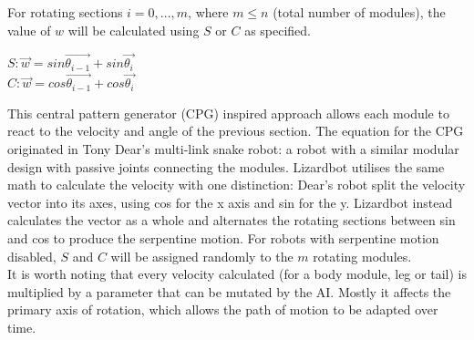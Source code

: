 \documentclass{article}
\begin{document}
For rotating sections $i = 0, ..., m$, where $m \leq n$ (total number of modules), the value of $w$ will be calculated using $S$ or $C$ as specified.\\
\begin{center}
\begin{Large}
$S: \overrightarrow{w} = sin\overrightarrow{\theta_{i-1}} + sin\overrightarrow{\theta_{i}}$
\\[1\baselineskip]
$C: \overrightarrow{w} = cos\overrightarrow{\theta_{i-1}} + cos\overrightarrow{\theta_{i}}$\\
\end{Large}
\end{center}

This central pattern generator (CPG) inspired approach allows each module to react to the velocity and angle of the previous section. The equation for the CPG originated in Tony Dear’s multi-link snake robot: a robot with a similar modular design with passive joints connecting the modules.  Lizardbot utilises the same math to calculate the velocity with one distinction: Dear’s robot split the velocity vector into its axes, using cos for the x axis and sin for the y. Lizardbot instead calculates the vector as a whole and alternates the rotating sections between sin and cos to produce the serpentine motion. For robots with serpentine motion disabled, $S$ and $C$ will be assigned randomly to the $m$ rotating modules.\\

It is worth noting that every velocity calculated (for a body module, leg or tail) is multiplied by a parameter that can be mutated by the AI. Mostly it affects the primary axis of rotation, which allows the path of motion to be adapted over time.
\end{document}
